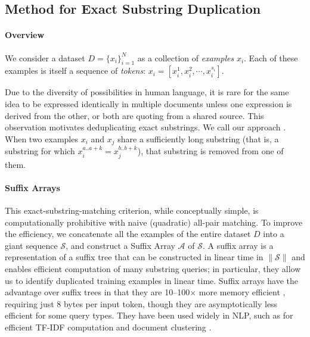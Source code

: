 \subsection{Method for Exact Substring Duplication} \label{sec:exact}

\paragraph{Overview}
We consider a dataset $D = \{x_i\}_{i=1}^N$ as a collection of \emph{examples} $x_i$.
Each of these examples is itself a sequence of \emph{tokens}: $x_i = \left[ x_i^1, x_i^2, \cdots, x_i^{s_i} \right]$.

Due to the diversity of possibilities in human language, it is rare for the same idea to be expressed identically in multiple documents unless one expression is derived from the other, or both are quoting from a shared source.
This observation motivates deduplicating exact substrings. We call our approach \Exact{}.
When two examples $x_i$ and $x_j$ share a sufficiently long substring (that is, a substring for which $x_i^{a..a+k} = x_j^{b..b+k}$), that substring is removed from one of them.

\paragraph{Suffix Arrays}
This exact-substring-matching criterion, while conceptually simple, is computationally prohibitive with naive (quadratic) all-pair matching.
%
To improve the efficiency, we concatenate all the examples of the entire dataset $D$ into a giant sequence $\mathcal{S}$, and construct a Suffix Array $\mathcal{A}$ of $\mathcal{S}$.
A suffix array \citep{manber1993suffix} is a representation of a suffix tree \citep{weiner1973linear} that can be constructed in linear time in $\lVert \mathcal{S} \rVert$ \citep{karkkainen2003simple}  
and enables efficient computation of many substring queries; in particular, they allow us to identify duplicated training examples in linear time.
Suffix arrays have the advantage over suffix trees in that they are 10--100$\times$
more memory efficient \cite{manber1993suffix}, requiring just 8 bytes per input token, though they are asymptotically less
efficient for some query types.
They have been used widely in NLP, such as for efficient TF-IDF computation \citep{yamamoto2001using} and document clustering \citep{hung2007new}.


